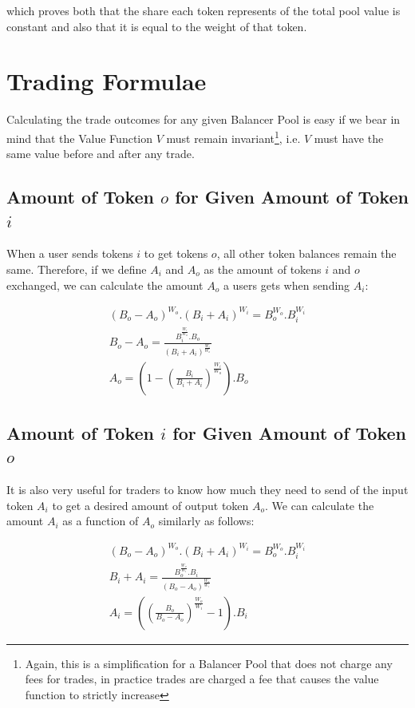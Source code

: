 \documentclass[11pt]{amsart}
\begin{document}
which proves both that the share each token represents of the total pool value is constant and also that it is equal to the weight of that token.


\section{Trading Formulae}

Calculating the trade outcomes for any given Balancer Pool is easy if we bear in mind that the Value Function $V$ must remain invariant\footnote{Again, this is a simplification for a Balancer Pool that does not charge any fees for trades, in practice trades are charged a fee that causes the value function to strictly increase}, i.e. $V$ must have the same value before and after any trade.

\subsection{Amount of Token $o$ for Given Amount of Token $i$}
When a user sends tokens $i$ to get tokens $o$, all other token balances remain the same. Therefore, if we define $A_{i}$ and $A_{o}$ as the amount of tokens $i$ and $o$ exchanged, we can calculate the amount $A_{o}$ a users gets when sending $A_{i}$:

\begin{equation}
\label{equation:A_o}
\begin{gathered}
(B_{o}-A_{o})^{W_{o}}.(B_{i}+A_{i})^{W_{i}} = B_{o}^{W_{o}}.B_{i}^{W_{i}} \\
B_{o}-A_{o} = \frac{B_{i}^{\frac{W_{i}}{W_{o}}}.B_{o}}{(B_{i}+A_{i})^{\frac{W_{i}}{W_{o}}}}\\
A_{o} = \left(1 - \left(\frac{B_{i}}{B_{i}+A_{i}}\right)^{\frac{W_{i}}{W_{o}}}\right).B_{o}
\end{gathered}
\end{equation}

\subsection{Amount of Token $i$ for Given Amount of Token $o$}
It is also very useful for traders to know how much they need to send of the input token $A_{i}$ to get a desired amount of output token $A_{o}$. We can calculate the amount $A_{i}$ as a function of $A_{o}$ similarly as follows:

\begin{equation}
\begin{gathered}
(B_{o}-A_{o})^{W_{o}}.(B_{i}+A_{i})^{W_{i}} = B_{o}^{W_{o}}.B_{i}^{W_{i}} \\
B_{i}+A_{i} = \frac{B_{o}^{\frac{W_{o}}{W_{i}}}.B_{i}}{(B_{o}-A_{o})^{\frac{W_{o}}{W_{i}}}}\\
A_{i} = \left(\left(\frac{B_{o}}{B_{o}-A_{o}}\right)^{\frac{W_{o}}{W_{i}}}-1\right).B_{i}
\end{gathered}
\end{equation}
\end{document}
